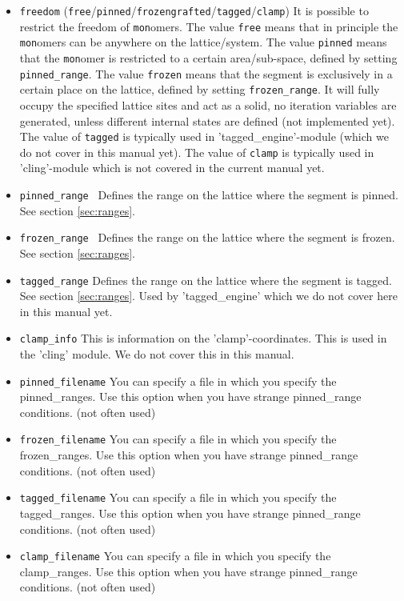 \documentclass{article}
\begin{document}
\begin{itemize}

\item{\tt freedom} ({\tt free}/{\tt pinned}/{\tt frozen}{\tt grafted}/{\tt tagged}/{\tt clamp}) It is possible to restrict the freedom of {\tt mon}omers.  The value {\tt free} means that in principle the {\tt mon}omers can be anywhere on the lattice/system.  The value {\tt pinned} means that the {\tt mon}omer is restricted to a certain area/sub-space, defined by setting \verb=pinned_range=.  The value {\tt frozen} means that the segment is exclusively in a certain place on the lattice, defined by setting \verb=frozen_range=.  It will fully occupy the specified lattice sites and act as a solid, no iteration variables are generated, unless different internal states are defined (not implemented yet). The value of {\tt tagged} is typically used in 'tagged_engine'-module (which we do not cover in this manual yet). The value of {\tt clamp} is typically used in 'cling'-module which is not covered in the current manual yet.  

\item {\tt pinned\_range } Defines the range on the lattice where the segment is pinned.  See section \ref{sec:ranges}.
 
\item {\tt frozen\_range } Defines the range on the lattice where the segment is frozen. See section \ref{sec:ranges}.

\item{\tt tagged\_range} Defines the range on the lattice where the segment is tagged. See section \ref{sec:ranges}. Used by 'tagged_engine' which we do not cover here in this manual yet. 

\item{\tt clamp\_info} This is information on the 'clamp'-coordinates. This is used in the 'cling' module. We do not cover this in this manual.

\item{\tt pinned\_filename} You can specify a file in which you specify the pinned\_ranges. Use this option when you have strange pinned\_range conditions. (not often used)
\item{\tt frozen\_filename} You can specify a file in which you specify the frozen\_ranges. Use this option when you have strange pinned\_range conditions. (not often used)
\item{\tt tagged\_filename} You can specify a file in which you specify the tagged\_ranges. Use this option when you have strange pinned\_range conditions. (not often used)
\item{\tt clamp\_filename} You can specify a file in which you specify the clamp\_ranges. Use this option when you have strange pinned\_range conditions. (not often used)


\end{itemize}
\end{document}
